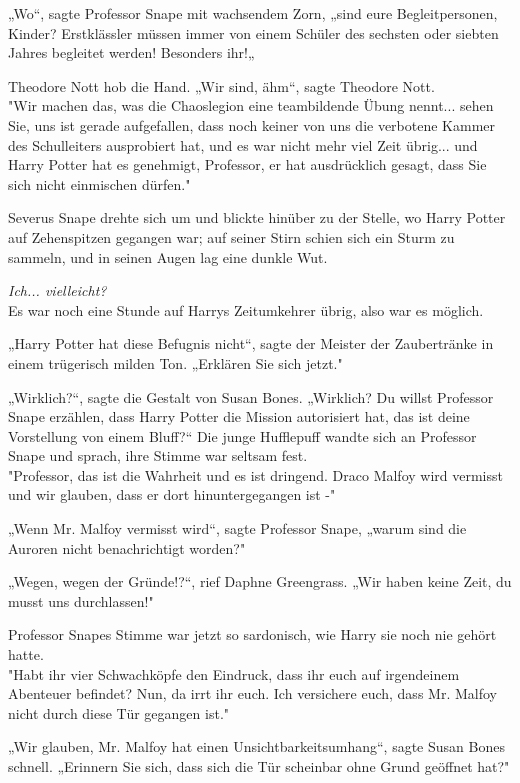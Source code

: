 {„Wo“, sagte Professor Snape mit wachsendem Zorn, „sind eure Begleitpersonen, Kinder? Erstklässler müssen immer von einem Schüler des sechsten oder siebten Jahres begleitet werden! Besonders ihr!„

Theodore Nott hob die Hand. „Wir sind, ähm“, sagte Theodore Nott.\\ "Wir machen das, was die Chaoslegion eine teambildende Übung nennt... sehen Sie, uns ist gerade aufgefallen, dass noch keiner von uns die verbotene Kammer des Schulleiters ausprobiert hat, und es war nicht mehr viel Zeit übrig... und Harry Potter hat es genehmigt, Professor, er hat ausdrücklich gesagt, dass Sie sich nicht einmischen dürfen."

Severus Snape drehte sich um und blickte hinüber zu der Stelle, wo Harry Potter auf Zehenspitzen gegangen war; auf seiner Stirn schien sich ein Sturm zu sammeln, und in seinen Augen lag eine dunkle Wut.

\emph{Ich... vielleicht?}\\ Es war noch eine Stunde auf Harrys Zeitumkehrer übrig, also war es möglich.

„Harry Potter hat diese Befugnis nicht“, sagte der Meister der Zaubertränke in einem trügerisch milden Ton. „Erklären Sie sich jetzt."

„Wirklich?“, sagte die Gestalt von Susan Bones. „Wirklich? Du willst Professor Snape erzählen, dass Harry Potter die Mission autorisiert hat, das ist deine Vorstellung von einem Bluff?“ Die junge Hufflepuff wandte sich an Professor Snape und sprach, ihre Stimme war seltsam fest.\\ "Professor, das ist die Wahrheit und es ist dringend. Draco Malfoy wird vermisst und wir glauben, dass er dort hinuntergegangen ist -"

„Wenn Mr. Malfoy vermisst wird“, sagte Professor Snape, „warum sind die Auroren nicht benachrichtigt worden?"

„Wegen, wegen der Gründe!?“, rief Daphne Greengrass. „Wir haben keine Zeit, du musst uns durchlassen!"

Professor Snapes Stimme war jetzt so sardonisch, wie Harry sie noch nie gehört hatte.\\ "Habt ihr vier Schwachköpfe den Eindruck, dass ihr euch auf irgendeinem Abenteuer befindet? Nun, da irrt ihr euch. Ich versichere euch, dass Mr. Malfoy nicht durch diese Tür gegangen ist."

„Wir glauben, Mr. Malfoy hat einen Unsichtbarkeitsumhang“, sagte Susan Bones schnell. „Erinnern Sie sich, dass sich die Tür scheinbar ohne Grund geöffnet hat?"

}
